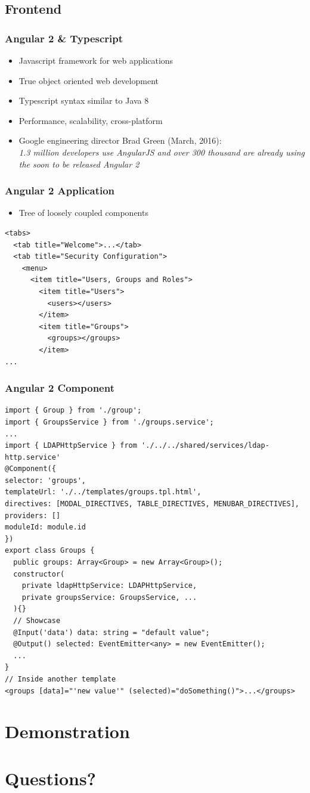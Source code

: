 \documentclass{beamer}
\begin{document}
\subsection{Frontend}

\begin{frame}
	\frametitle{Angular 2 \& Typescript}
	\begin{itemize}
		\item Javascript framework for web applications
		\item True object oriented web development
		\item Typescript syntax similar to Java 8
		\item Performance, scalability, cross-platform
		\item Google engineering director Brad Green (March, 2016):\\
		\emph{1.3 million developers use AngularJS and over 300 thousand are already using the soon to be released Angular 2}
	\end{itemize}
\end{frame}

\begin{frame}[fragile]
	\frametitle{Angular 2 Application}
	\begin{itemize}
		\item Tree of loosely coupled components
	\end{itemize}
	\begin{lstlisting}[frame=single]
<tabs>
  <tab title="Welcome">...</tab>
  <tab title="Security Configuration"> 
    <menu> 
      <item title="Users, Groups and Roles">
        <item title="Users">
          <users></users>
        </item>
        <item title="Groups">
          <groups></groups>
        </item>
...
	\end{lstlisting}
\end{frame}

\begin{frame}[fragile]
	\frametitle{Angular 2 Component}
	\lstset{%
		basicstyle=\tiny
	}
	\begin{lstlisting}[frame=single]
import { Group } from './group';
import { GroupsService } from './groups.service';
...
import { LDAPHttpService } from './../../shared/services/ldap-http.service'
@Component({
selector: 'groups',
templateUrl: './../templates/groups.tpl.html',
directives: [MODAL_DIRECTIVES, TABLE_DIRECTIVES, MENUBAR_DIRECTIVES],
providers: []
moduleId: module.id
})
export class Groups {
  public groups: Array<Group> = new Array<Group>();
  constructor(
    private ldapHttpService: LDAPHttpService,
    private groupsService: GroupsService, ...
  ){}
  // Showcase
  @Input('data') data: string = "default value";
  @Output() selected: EventEmitter<any> = new EventEmitter();
  ...
}
// Inside another template
<groups [data]="'new value'" (selected)="doSomething()">...</groups>
	\end{lstlisting}
\end{frame}

\section{Demonstration}

\section{Questions?}
\end{document}
